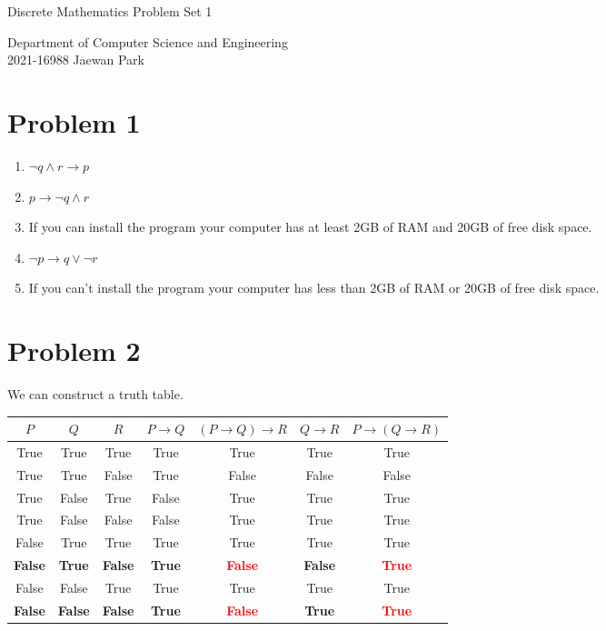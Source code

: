 \documentclass[10pt]{article}
\begin{document}
\vspace{4mm}
\begin{center}
  {\LARGE Discrete Mathematics Problem Set 1} \\
\end{center}
\begin{flushright}
  Department of Computer Science and Engineering \\
  2021-16988 Jaewan Park
\end{flushright}

\section*{Problem 1}
\begin{enumerate}
  \item $\neg q \wedge r \rightarrow p$
  \item $p \rightarrow \neg q \wedge r$
  \item If you can install the program your computer has at least 2GB of RAM and 20GB of free disk space.
  \item $\neg p \rightarrow q \vee \neg r$
  \item If you can't install the program your computer has less than 2GB of RAM or 20GB of free disk space.
\end{enumerate}

\section*{Problem 2}
We can construct a truth table.
\begin{table}[H]
  \centering
  \renewcommand{\arraystretch}{1.5}
  \begin{tabular}{|c|c|c|c|c|c|c|}
    \hline
    $P$ & $Q$ & $R$ & $P \rightarrow Q$ & $(P \rightarrow Q) \rightarrow R$ & $Q \rightarrow R$ & $P \rightarrow (Q \rightarrow R)$ \\ \hline
    True & True & True & True & True & True & True \\ \hline
    True & True & False & True & False & False & False \\ \hline
    True & False & True & False & True & True & True \\ \hline
    True & False & False & False & True & True & True \\ \hline
    False & True & True & True & True & True & True \\ \hline
    \bfseries False & \bfseries True & \bfseries False & \bfseries True & \bfseries \textcolor{red}{False} & \bfseries False & \bfseries \textcolor{red}{True} \\ \hline
    False & False & True & True & True & True & True \\ \hline
    \bfseries False & \bfseries False & \bfseries False & \bfseries True & \bfseries \textcolor{red}{False} & \bfseries True & \bfseries \textcolor{red}{True} \\
    \hline
  \end{tabular}
\end{table}
\end{document}
